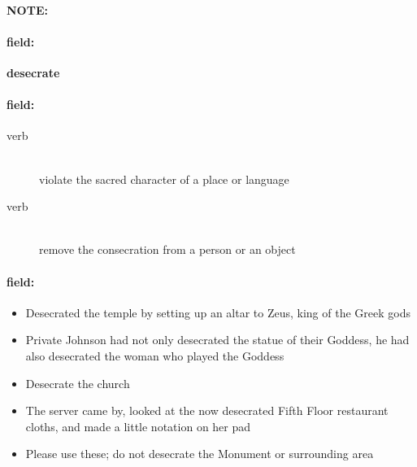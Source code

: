 \documentclass[12pt]{article}
\newenvironment{note}{\paragraph{NOTE:}}{}
\newenvironment{field}{\paragraph{field:}}{}
\begin{document}
\begin{note}
\begin{field}
\textbf{\large desecrate}
\end{field}


\begin{field}
\begin{description}
\item[verb] \hfill \\ 
violate the sacred character of a place or language

\item[verb] \hfill \\ 
remove the consecration from a person or an object

\end{description}
\end{field}

\begin{field}
\begin{itemize}
\item Desecrated the temple by setting up an altar to Zeus, king of the Greek gods
\item Private Johnson had not only desecrated the statue of their Goddess, he had also desecrated the woman who played the Goddess
\item Desecrate the church
\item The server came by, looked at the now desecrated Fifth Floor restaurant cloths, and made a little notation on her pad
\item Please use these; do not desecrate the Monument or surrounding area
\end{itemize}
\end{field}
\end{note}
\end{document}
